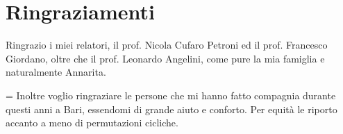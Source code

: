 \chapter{Ringraziamenti}

Ringrazio i miei relatori, il prof. Nicola Cufaro Petroni ed il prof. Francesco Giordano, oltre che il prof. Leonardo Angelini, come pure la mia famiglia e naturalmente Annarita.

\vspace{\baselineskip}

\noindent
\begin{minipage}{0.6\textwidth}\parindent=\oldparindent
Inoltre voglio ringraziare le persone che mi hanno fatto compagnia durante questi anni a Bari, essendomi di grande aiuto e conforto. Per equità le riporto accanto a meno di permutazioni cicliche.
\end{minipage}
\begin{minipage}{0.4\textwidth}
\centering
\end{minipage}

\cleardoublepage
